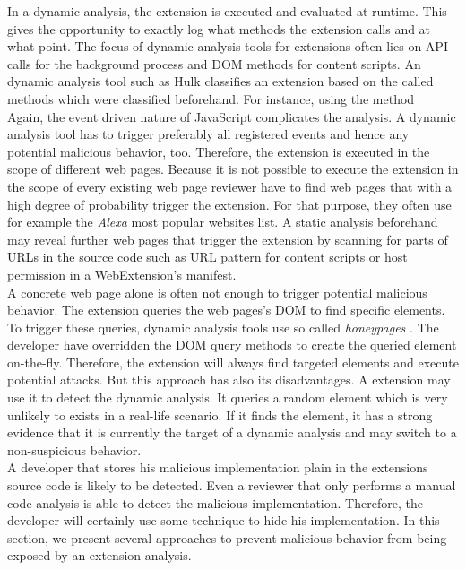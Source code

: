 	In a dynamic analysis, the extension is executed and evaluated at runtime. This gives the opportunity to exactly log what methods the extension calls and at what point. The focus of dynamic analysis tools for extensions often lies on API calls for the background process and DOM methods for content scripts. An dynamic analysis tool such as Hulk classifies an extension based on the called methods which were classified beforehand. For instance, using the method \\ %
	Again, the event driven nature of JavaScript complicates the analysis. A dynamic analysis tool has to trigger preferably all registered events and hence any potential malicious behavior, too. Therefore, the extension is executed in the scope of different web pages. Because it is not possible to execute the extension in the scope of every existing web page reviewer have to find web pages that with a high degree of probability trigger the extension. For that purpose, they often use for example the \textit{Alexa} most popular websites list. A static analysis beforehand may reveal further web pages that trigger the extension by scanning for parts of URLs in the source code such as URL pattern for content scripts or host permission in a WebExtension's manifest. \\ 
	A concrete web page alone is often not enough to trigger potential malicious behavior. The extension queries the web pages's DOM to find specific elements. To trigger these queries, dynamic analysis tools use so called \textit{honeypages} \cite{184485,190984}. The developer have overridden the DOM query methods to create the queried element on-the-fly. Therefore, the extension will always find targeted elements and execute potential attacks. But this approach has also its disadvantages. A extension may use it to detect the dynamic analysis. It queries a random element which is very unlikely to exists in a real-life scenario. If it finds the element, it has a strong evidence that it is currently the target of a dynamic analysis and may switch to a non-suspicious behavior. \\
	
	A developer that stores his malicious implementation plain in the extensions source code is likely to be detected. Even a reviewer that only performs a manual code analysis is able to detect the malicious implementation. Therefore, the developer will certainly use some technique to hide his implementation. In this section, we present several approaches to prevent malicious behavior from being exposed by an extension analysis.
	

